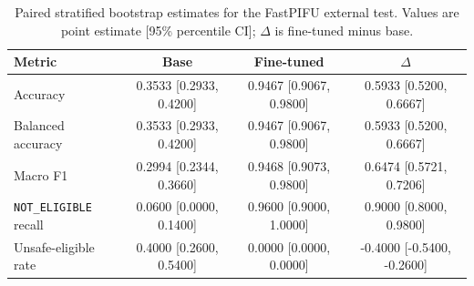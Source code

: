 \begin{table}[htbp]
\centering
\caption{Paired stratified bootstrap estimates for the FastPIFU external test. Values are point estimate [95\% percentile CI]; $\Delta$ is fine-tuned minus base.}
\label{tab:pifu_external_test_bootstrap}
\begin{tabular}{lccc}
\toprule
Metric & Base & Fine-tuned & $\Delta$ \\
\midrule
Accuracy & 0.3533 [0.2933, 0.4200] & 0.9467 [0.9067, 0.9800] & 0.5933 [0.5200, 0.6667] \\
Balanced accuracy & 0.3533 [0.2933, 0.4200] & 0.9467 [0.9067, 0.9800] & 0.5933 [0.5200, 0.6667] \\
Macro F1 & 0.2994 [0.2344, 0.3660] & 0.9468 [0.9073, 0.9800] & 0.6474 [0.5721, 0.7206] \\
\texttt{NOT\_ELIGIBLE} recall & 0.0600 [0.0000, 0.1400] & 0.9600 [0.9000, 1.0000] & 0.9000 [0.8000, 0.9800] \\
Unsafe-eligible rate & 0.4000 [0.2600, 0.5400] & 0.0000 [0.0000, 0.0000] & -0.4000 [-0.5400, -0.2600] \\
\bottomrule
\end{tabular}
\end{table}
